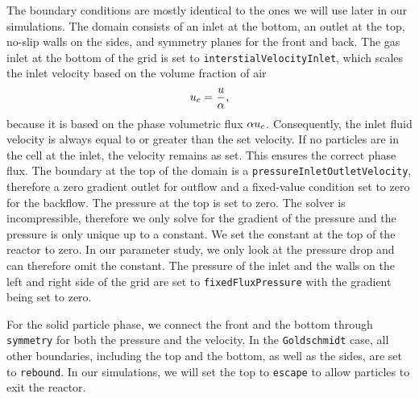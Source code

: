 The boundary conditions are mostly identical to the ones we will use later in our simulations.
The domain consists of an inlet at the bottom, an outlet at the top, no-slip walls on the sides, and symmetry planes for the front and back.
The gas inlet at the bottom of the grid is set to \lstinline|interstialVelocityInlet|, which scales the inlet velocity based on the volume fraction of air
\begin{equation*}
    u_c = \dfrac{u}{\alpha},
\end{equation*}
because it is based on the phase volumetric flux $\alpha u_c$.
Consequently, the inlet fluid velocity is always equal to or greater than the set velocity.
If no particles are in the cell at the inlet, the velocity remains as set. This ensures the correct phase flux.
The boundary at the top of the domain is a \lstinline|pressureInletOutletVelocity|, therefore a zero gradient outlet for outflow and a fixed-value condition set to zero for the backflow.
The pressure at the top is set to zero. The \MP solver is incompressible, therefore we only solve for the gradient of the pressure and the pressure is only unique up to a constant.
We set the constant at the top of the reactor to zero.
In our parameter study, we only look at the pressure drop and can therefore omit the constant.
The pressure of the inlet and the walls on the left and right side of the grid are set to \lstinline|fixedFluxPressure| with the gradient being set to zero.

For the solid particle phase, we connect the front and the bottom through \lstinline|symmetry| for both the pressure and the velocity.
In the \lstinline|Goldschmidt| case, all other boundaries, including the top and the bottom, as well as the sides, are set to \lstinline|rebound|.
In our simulations, we will set the top to \lstinline|escape| to allow particles to exit the reactor.








